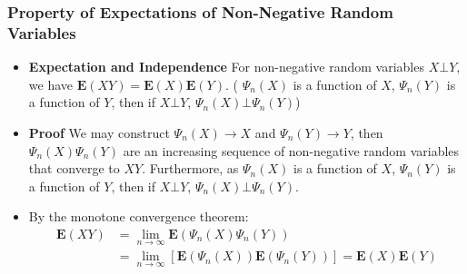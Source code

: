 \documentclass[handout]{beamer}
\newcommand{\BE}{\mathbf{E}}
\begin{document}
\frame
{
  \frametitle{Property of Expectations of Non-Negative Random Variables }

   \begin{itemize}



                         
                                                  \item<1->  \textbf{Expectation and Independence} For non-negative random variables $X\bot Y$, we have $\BE(XY)=\BE(X) \BE(Y)$. ( $\Psi_n(X)$ is a function of $X$, $\Psi_n(Y)$ is a function of $Y$, then if $X\bot Y$, $\Psi_n(X)\bot \Psi_n(Y)$) 
                                                  
                                                  
                                                                           \item<2->\textbf{Proof} We may construct $\Psi_n(X)\rightarrow X$ and $\Psi_n(Y)\rightarrow Y$, then $\Psi_n(X)\Psi_n(Y)$ are an increasing sequence of non-negative random variables that converge to $XY$.  Furthermore, as $\Psi_n(X)$ is a function of $X$, $\Psi_n(Y)$ is a function of $Y$, then if $X\bot Y$, $\Psi_n(X)\bot \Psi_n(Y)$.
                                                                           
                                                                           
                                                                   \item<3->[-]          By the monotone convergence theorem:
                                                         \begin{align*}\BE(XY)& =\lim_{n\rightarrow \infty} \BE (\Psi_n(X)\Psi_n(Y)) \\ & =\lim_{n\rightarrow \infty}[ \BE(\Psi_n(X)) \BE(\Psi_n(Y)) ]=\BE(X)\BE(Y)\end{align*}


                                                  
                              
                                                  
                                 \end{itemize}
}
\end{document}
